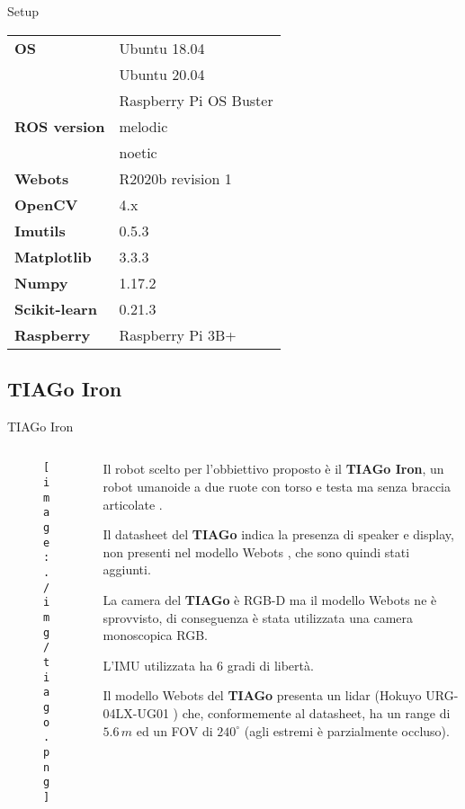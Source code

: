 \documentclass[aspectratio=169, leqno]{beamer}
\begin{document}
	\begin{frame}{Setup}
	\centering
	\begin{tabular}{l l}
		\hline
		\textbf{OS} & Ubuntu 18.04 \\
					& Ubuntu 20.04 \\ 
					& Raspberry Pi OS Buster\\
		\textbf{ROS version} & melodic \\
							 & noetic \\ 
		\textbf{Webots}	& R2020b revision 1\\ 
		\textbf{OpenCV}~\cite{opencv} 	& 4.x \\
		\textbf{Imutils}~\cite{imutils} & 0.5.3 \\
		\textbf{Matplotlib}~\cite{matplotlib} & 3.3.3 \\
		\textbf{Numpy}~\cite{numpy} & 1.17.2 \\
		\textbf{Scikit-learn}~\cite{scikit} & 0.21.3\\
		\textbf{Raspberry} & Raspberry Pi 3B+ \\\hline
	\end{tabular}
	\end{frame}

	\subsection{TIAGo Iron}\label{subsec:TIAGo-Iron} 
	\begin{frame}{TIAGo Iron}

	\begin{columns}
		\begin{column}{0.2\textwidth}
			\begin{figure}[htpb]
				\centering
				\texttt{[image: ./img/tiago.png]}
				\label{fig:tiago}
			\end{figure}
		\end{column}

		\begin{column}{0.8\textwidth}
		\justifying
		Il robot scelto per l'obbiettivo proposto è il \textbf{TIAGo Iron}, un
		robot umanoide a due ruote con torso e testa ma senza braccia
		articolate \cite{pages2016tiago}.
		
		Il datasheet del \textbf{TIAGo} \cite{tiago_datasheet} indica la
		presenza di speaker e display, non  presenti nel modello Webots
		\cite{tiagoiron}, che sono quindi stati aggiunti.
		
		La camera del \textbf{TIAGo} è RGB-D ma il modello Webots ne è
		sprovvisto, di conseguenza è stata utilizzata una camera monoscopica
		RGB. 
		
		L'IMU utilizzata ha 6 gradi di libertà. 
		
		Il modello Webots del \textbf{TIAGo} presenta un lidar (Hokuyo
		URG-04LX-UG01 \cite{lidarspecs}) che, conformemente al datasheet,  ha
		un range di $5.6\,m$ ed un FOV di $240^{\circ}$ (agli estremi è
		parzialmente occluso).
		\end{column}
		
	\end{columns}
	
	\end{frame}
\end{document}

